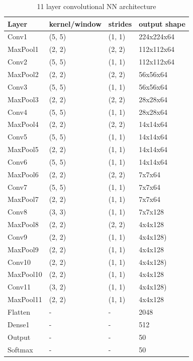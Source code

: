 \documentclass[a4paper]{article}
\begin{document}
\begin{table}[!hbt]
    \caption{ 11 layer convolutional NN architecture
    \label{table:layers11}
    }
\begin{center}
    \begin{tabular}{| l | l | l | l |}
    \hline
        Layer & kernel/window& strides & output shape\\
    \hline
        Conv1  & (5, 5)&        (1, 1)&     224x224x64  \\
    \hline
        MaxPool1 & (2, 2)&      (2, 2)&     112x112x64  \\
        Conv2  & (5, 5)&        (1, 1)&     112x112x64  \\
    \hline
        MaxPool2 & (2, 2)&      (2, 2)&     56x56x64    \\
        Conv3  & (5, 5)&        (1, 1)&     56x56x64    \\
    \hline
        MaxPool3 & (2, 2)&      (2, 2)&     28x28x64    \\
        Conv4  & (5, 5)&        (1, 1)&     28x28x64  \\
    \hline
        MaxPool4 & (2, 2)&      (2, 2)&     14x14x64  \\
        Conv5  & (5, 5)&        (1, 1)&     14x14x64  \\ %
    \hline
        MaxPool5 & (2, 2)&      (1, 1)&     14x14x64  \\
        Conv6  & (5, 5)&        (1, 1)&     14x14x64  \\
    \hline
        MaxPool6 & (2, 2)&      (2, 2)&     7x7x64  \\
        Conv7  & (5, 5)&        (1, 1)&     7x7x64  \\  %
    \hline
        MaxPool7 & (2, 2)&      (1, 1)&     7x7x64  \\
        Conv8  & (3, 3)&        (1, 1)&     7x7x128\\
    \hline
        MaxPool8 & (2, 2)&      (2, 2)&     4x4x128  \\
        Conv9  & (2, 2)&        (1, 1)&     4x4x128)\\
    \hline
        MaxPool9 & (2, 2)&      (1, 1)&     4x4x128  \\
        Conv10 & (2, 2)&        (1, 1)&     4x4x128)\\  %
    \hline
        MaxPool10 & (2, 2)&      (1, 1)&     4x4x128  \\
        Conv11 & (3, 2)&        (1, 1)&     4x4x128)\\  %
    \hline
        MaxPool11 & (2, 2)&      (1, 1)&     4x4x128  \\
        Flatten & - & - & 2048 \\
        Dense1 & - & - & 512 \\
    \hline
        Output & - & - & 50 \\
        Softmax & - & - & 50 \\
    \hline
    \end{tabular}
\end{center}
\end{table}
\end{document}
